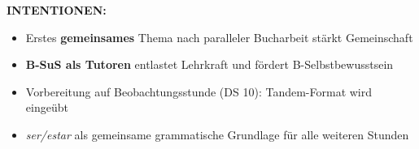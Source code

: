 \documentclass[11pt, a4paper]{article}
\newcommand{\es}[1]{\textcolor{spanisch}{\textit{#1}}}
\begin{document}
\begin{dsbox}[title={DS 6 -- Brückenthema: Personas y características (Di, 20.01.2026)}]
\vspace{0.2cm}

\textbf{INTENTIONEN:}
\begin{itemize}[leftmargin=1.5em, nosep]
    \item Erstes \textbf{gemeinsames} Thema nach paralleler Bucharbeit stärkt Gemeinschaft
    \item \textcolor{gruppeB}{\textbf{B-SuS als Tutoren}} entlastet Lehrkraft und fördert B-Selbstbewusstsein
    \item Vorbereitung auf Beobachtungsstunde (DS 10): Tandem-Format wird eingeübt
    \item \es{ser/estar} als gemeinsame grammatische Grundlage für alle weiteren Stunden
\end{itemize}

\end{dsbox}

\vspace{0.5cm}
\end{document}
